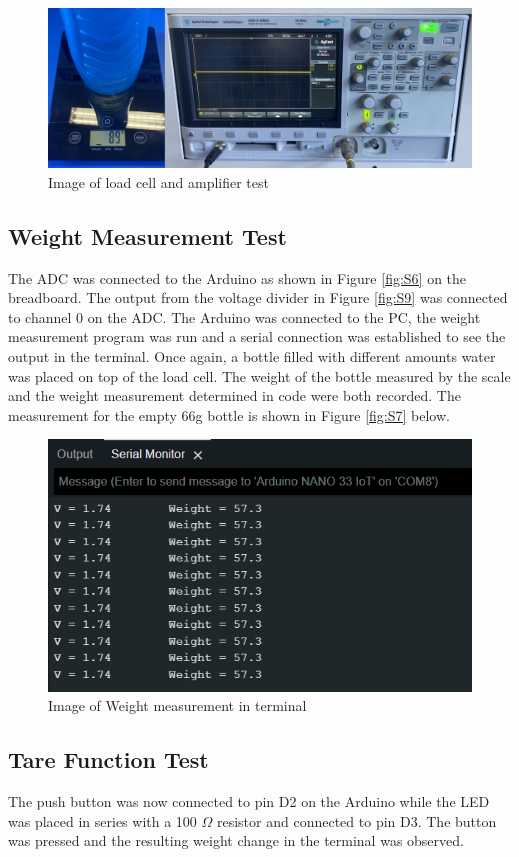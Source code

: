 \documentclass[class=report,11pt,crop=false]{standalone}
\begin{document}
	\begin{figure}[h!]
		\centering
		\includegraphics[width=0.8\linewidth]{Figures/ATP3.jpg}
		\caption{Image of load cell and amplifier test}
		\label{fig:S10}
	\end{figure}
	
	\subsection{Weight Measurement Test}
	The ADC was connected to the Arduino as shown in Figure \ref{fig:S6} on the breadboard. The output from the voltage divider in Figure \ref{fig:S9} was connected to channel 0 on the ADC. The Arduino was connected to the PC, the weight measurement program was run and a serial connection was established to see the output in the terminal. Once again, a bottle filled with different amounts water was placed on top of the load cell. The weight of the bottle measured by the scale and the weight measurement determined in code were both recorded. The measurement for the empty 66g bottle is shown in Figure \ref{fig:S7} below.
	\begin{figure}[h!]
		\centering
		\includegraphics[width=0.6\linewidth]{Figures/Weight Measurement.png}
		\caption{Image of Weight measurement in terminal}
		\label{fig:S17}
	\end{figure}
	
	\subsection{Tare Function Test}
	The push button was now connected to pin D2 on the Arduino while the LED was placed in series with a 100 $\Omega$ resistor and connected to pin D3. The button was pressed and the resulting weight change in the terminal was observed. 
	 
\end{document}
